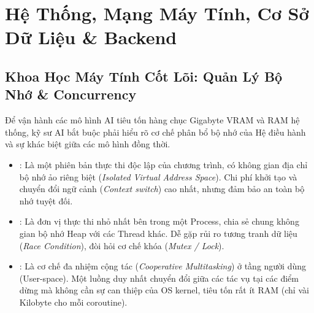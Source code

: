 
\chapter{Hệ Thống, Mạng Máy Tính, Cơ Sở Dữ Liệu \& Backend}
\label{ch:phase1-systems}

\section{Khoa Học Máy Tính Cốt Lõi: Quản Lý Bộ Nhớ \& Concurrency}
\label{sec:sys-cs-core}

Để vận hành các mô hình AI tiêu tốn hàng chục Gigabyte VRAM và RAM hệ thống, kỹ sư AI bắt buộc phải hiểu rõ cơ chế phân bổ bộ nhớ của Hệ điều hành và sự khác biệt giữa các mô hình đồng thời.

\begin{definitionbox}
\begin{itemize}
  \item {}: Là một phiên bản thực thi độc lập của chương trình, có không gian địa chỉ bộ nhớ ảo riêng biệt (\textit{Isolated Virtual Address Space}). Chi phí khởi tạo và chuyển đổi ngữ cảnh (\textit{Context switch}) cao nhất, nhưng đảm bảo an toàn bộ nhớ tuyệt đối.
  \item {}: Là đơn vị thực thi nhỏ nhất bên trong một Process, chia sẻ chung không gian bộ nhớ Heap với các Thread khác. Dễ gặp rủi ro tương tranh dữ liệu (\textit{Race Condition}), đòi hỏi cơ chế khóa (\textit{Mutex / Lock}).
  \item {}: Là cơ chế đa nhiệm cộng tác (\textit{Cooperative Multitasking}) ở tầng người dùng (User-space). Một luồng duy nhất chuyển đổi giữa các tác vụ tại các điểm dừng  mà không cần sự can thiệp của OS kernel, tiêu tốn rất ít RAM (chỉ vài Kilobyte cho mỗi coroutine).
\end{itemize}
\end{definitionbox}

